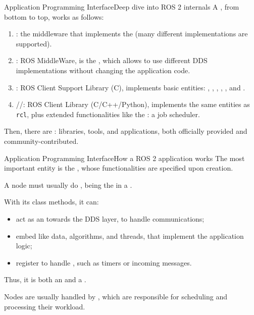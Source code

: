 \begin{frame}{Application Programming Interface}{Deep dive into ROS 2 internals}
  A , from bottom to top, works as follows:
  \begin{enumerate}
    \item {}: the middleware that implements the  (many different implementations are supported).
    \item {}: ROS MiddleWare, is the , which allows to use different DDS implementations without changing the application code.
    \item {}: ROS Client Support Library (C), implements basic entities: , , , , , and .
    \item {}//: ROS Client Library (C/C++/Python), implements the same entities as \texttt{rcl}, plus extended functionalities like the : a job scheduler.
  \end{enumerate}
  Then, there are : libraries, tools, and applications, both officially provided and community-contributed.
\end{frame}
\begin{frame}{Application Programming Interface}{How a ROS 2 application works}
  The most important entity is the , whose functionalities are specified upon creation.

  A node must usually do , being the  in a .

  With its class methods, it can:
  \begin{itemize}
    \item act as an  towards the DDS layer, to handle communications;
    \item embed  like data, algorithms, and threads, that implement the application logic;
    \item register  to handle , such as timers or incoming messages.
  \end{itemize}
  Thus, it is both an  and a .

  Nodes are usually handled by , which are responsible for scheduling and processing their workload.

  \begin{alertblock}{}
    \centering
  \end{alertblock}
\end{frame}

